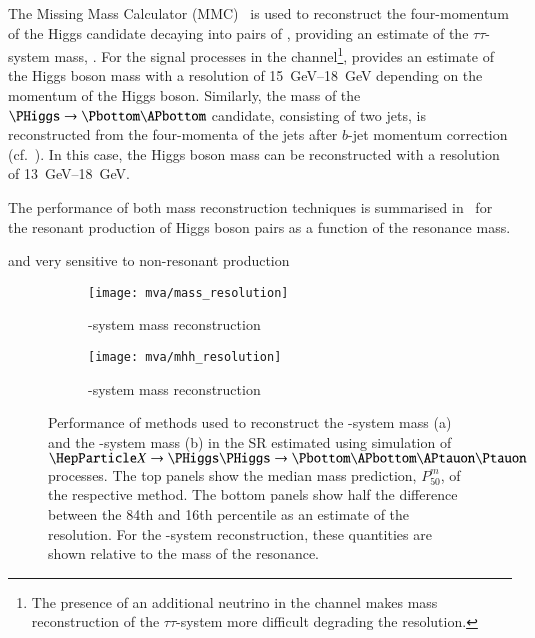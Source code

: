 The Missing Mass Calculator (MMC)~\cite{Elagin:2010aw} is used to
reconstruct the four-momentum of the Higgs candidate decaying into
pairs of \tauleptons, providing an estimate of the $\tau\tau$-system
mass, \mMMC. For the signal processes in the \hadhad
channel\footnote{The presence of an additional neutrino in the \lephad
  channel makes mass reconstruction of the $\tau\tau$-system more
  difficult degrading the resolution.}, \mMMC provides an estimate of
the Higgs boson mass with a resolution of \SIrange{15}{18}{\GeV}
depending on the momentum of the Higgs boson. Similarly, the mass of
the $\PHiggs \ra \Pbottom\APbottom$ candidate, consisting of two
\btagged jets, is reconstructed from the four-momenta of the jets
after $b$-jet momentum correction (cf.~). In this case,
the Higgs boson mass can be reconstructed with a resolution of
\SIrange{13}{18}{\GeV}.

The performance of both mass reconstruction techniques is summarised
in~ for the resonant production of
Higgs boson pairs as a function of the resonance mass.

\mMMC and \mBB very sensitive to non-resonant production


\begin{figure}[htbp]
  \centering

  \begin{subfigure}[t]{.5\textwidth}
    \centering
    \texttt{[image: mva/mass\_resolution]}
    \caption{\PHiggs-system mass reconstruction}
    \label{fig:mass_reconstruction_H}
  \end{subfigure}\hfill%
  \begin{subfigure}[t]{.5\textwidth}
    \centering
    \texttt{[image: mva/mhh\_resolution]}
    \caption{\HH-system mass reconstruction}
    \label{fig:mass_reconstruction_HH}
  \end{subfigure}

  \caption{Performance of methods used to reconstruct the
    \PHiggs-system mass (a) and the \HH-system mass (b) in the \hadhad
    SR estimated using simulation of $\PX \ra \HH \ra \bbtautau$
    processes. The top panels show the median mass prediction,
    $P_{50}^{m}$, of the respective method. The bottom panels show
    half the difference between the 84th and 16th percentile as an
    estimate of the resolution. For the \HH-system reconstruction,
    these quantities are shown relative to the mass of the resonance.}
  \label{fig:mass_reconstruction}
\end{figure}


